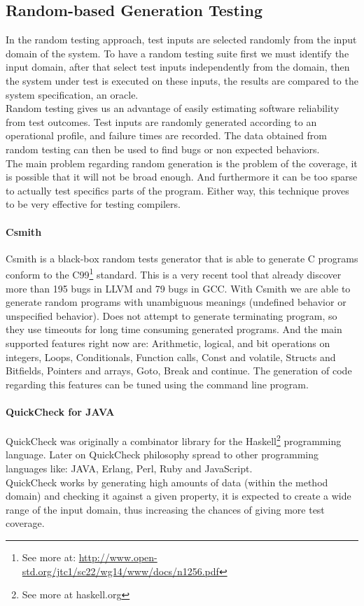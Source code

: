 \subsection{Random-based Generation Testing}
In the random testing approach, test inputs are selected randomly from the input domain of the system.
To have a random testing suite first we must identify the input domain, after that select test inputs independently from the domain,
then the system under test is executed on these inputs, the results are compared to the system specification, an oracle.\\
Random testing gives us an advantage of easily estimating software reliability from test outcomes.
Test inputs are randomly generated according to an operational profile, and failure times are recorded.
The data obtained from random testing can then be used to find bugs or non expected behaviors.\\
\indent The main problem regarding random generation is the problem of the coverage, it is possible that it will not be broad enough. And furthermore it can be
too sparse to actually test specifics parts of the program. Either way, this technique proves to be very effective for testing compilers.

\paragraph{Csmith}
Csmith\cite{Yang:2011:FUB:1993316.1993532} is a black-box random tests generator that is able to generate C programs
conform to the C99\footnote{See more at: \url{http://www.open-std.org/jtc1/sc22/wg14/www/docs/n1256.pdf}} standard. This is a very recent tool that already discover
more than 195 bugs in \ac{LLVM} and 79 bugs in \ac{GCC}. With Csmith we are able to generate random programs with unambiguous meanings (undefined behavior or 
unspecified behavior). Does not attempt to generate terminating program, so they use timeouts for long time consuming generated programs.
And the main supported features right now are: Arithmetic, logical, and bit operations on integers, Loops, Conditionals, Function calls, Const and volatile,
Structs and Bitfields, Pointers and arrays, Goto, Break and continue. The generation of code regarding this features can be tuned using the command line program.

\paragraph{QuickCheck for JAVA}
QuickCheck was originally a combinator library for the Haskell\footnote{See more at haskell.org} programming language\cite{Claessen:2000:QLT:357766.351266}.
Later on QuickCheck philosophy spread to other programming languages like: JAVA, Erlang, Perl, Ruby and JavaScript.\\
QuickCheck works by generating high amounts of data (within the method domain) and checking it against a given property,
it is expected to create a wide range of the input domain, thus increasing the chances of giving more test coverage.
\secendnote
